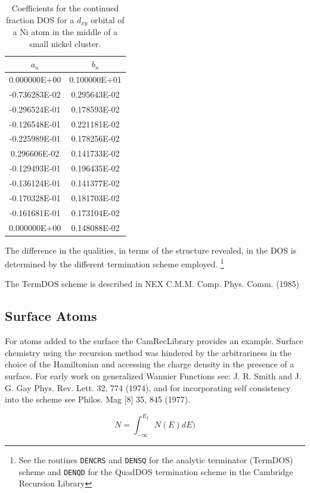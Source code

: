 \begin{table}
\begin{center}
\begin{tabular}{|c|c|}
\hline
$a_{n}$ & $b_{n}$ \\
\hline
 0.000000E+00 & 0.100000E+01\\
-0.736283E-02 & 0.295643E-02\\
-0.296524E-01 & 0.178593E-02\\
-0.126548E-01 & 0.221181E-02\\
-0.225989E-01 & 0.178256E-02\\
 0.296606E-02 & 0.141733E-02\\
-0.129493E-01 & 0.196435E-02\\
-0.136124E-01 & 0.141377E-02\\
-0.170328E-01 & 0.181703E-02\\
-0.161681E-01 & 0.173104E-02\\
 0.000000E+00 & 0.148088E-02\\
\hline
\end{tabular}
\caption{Coefficients for the continued fraction DOS for a $d_{xy}$ orbital of a Ni 
atom in the middle of a small nickel cluster.}
\end{center}
\end{table}

The difference in the qualities, in terms of the structure revealed, in the DOS 
is determined by the different termination scheme employed. \footnote{See the routines 
\texttt{DENCRS} and \texttt{DENSQ} for the analytic terminator (TermDOS) scheme and \texttt{DENQD} 
for the QuadDOS termination scheme in the Cambridge Recursion Library}

The TermDOS scheme is described in NEX C.M.M. Comp. Phys. Comm.  (1985)

\subsection{Surface Atoms}
For atoms added to the surface the CamRecLibrary provides an example. 
Surface chemistry using the recursion method was hindered 
by the arbitrariness in the choice of the Hamiltonian and accessing the 
charge density in the presence of a surface.
For early work on generalized Wannier Functions see: 
J. R. Smith and J. G. Gay Phys. Rev. Lett. 32, 774 (1974),
and for incorporating self consistency into the scheme see
Philos. Mag [8] 35, 845 (1977).

\begin{equation}
N = \int_{-\infty}^{E_{f}}N(E) dE)
\end{equation}

